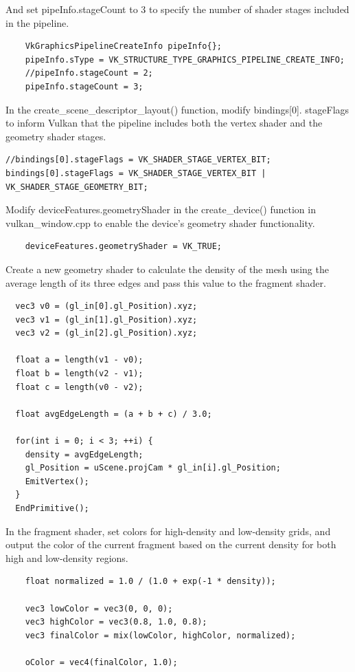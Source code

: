 \documentclass[10pt]{article}
\begin{document}
\noindent And set pipeInfo.stageCount to 3 to specify the number of shader stages included in the pipeline.

\begin{lstlisting}
    VkGraphicsPipelineCreateInfo pipeInfo{};
    pipeInfo.sType = VK_STRUCTURE_TYPE_GRAPHICS_PIPELINE_CREATE_INFO;
    //pipeInfo.stageCount = 2;
    pipeInfo.stageCount = 3;
\end{lstlisting}

\noindent In the create\_scene\_descriptor\_layout() function, modify bindings[0].
stageFlags to inform Vulkan that the pipeline includes both the vertex shader and the geometry shader stages.

\begin{lstlisting}
//bindings[0].stageFlags = VK_SHADER_STAGE_VERTEX_BIT;
bindings[0].stageFlags = VK_SHADER_STAGE_VERTEX_BIT | VK_SHADER_STAGE_GEOMETRY_BIT;
\end{lstlisting}

\noindent Modify deviceFeatures.geometryShader in the create\_device() function in vulkan\_window.cpp to enable the device's geometry shader functionality.

\begin{lstlisting}
    deviceFeatures.geometryShader = VK_TRUE;
\end{lstlisting}

\noindent Create a new geometry shader to calculate the density of the mesh using the average length of its three edges and pass this value to the fragment shader.

\begin{lstlisting}    
  vec3 v0 = (gl_in[0].gl_Position).xyz;
  vec3 v1 = (gl_in[1].gl_Position).xyz;
  vec3 v2 = (gl_in[2].gl_Position).xyz;

  float a = length(v1 - v0);
  float b = length(v2 - v1);
  float c = length(v0 - v2);

  float avgEdgeLength = (a + b + c) / 3.0;
  
  for(int i = 0; i < 3; ++i) {
	density = avgEdgeLength;
    gl_Position = uScene.projCam * gl_in[i].gl_Position;
    EmitVertex();
  }
  EndPrimitive();
\end{lstlisting}

\noindent In the fragment shader, set colors for high-density and low-density grids, and output the color of the current fragment based on the current density for both high and low-density regions.

\begin{lstlisting}
    float normalized = 1.0 / (1.0 + exp(-1 * density));

    vec3 lowColor = vec3(0, 0, 0);
    vec3 highColor = vec3(0.8, 1.0, 0.8);
    vec3 finalColor = mix(lowColor, highColor, normalized);

    oColor = vec4(finalColor, 1.0);
\end{lstlisting}
\end{document}
